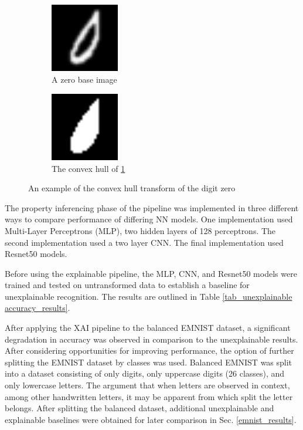 \documentclass[conference]{IEEEtran}
\begin{document}
\begin{figure}[h]
    \centering
    \begin{subfigure}{.5\columnwidth}
        \centering
        \includegraphics[width=3cm]{./images/raw_0-0-12.png}
        \caption{A zero base image}
        \label{fig:zero_raw}
    \end{subfigure}%
    \begin{subfigure}{.5\columnwidth}
        \centering
        \includegraphics[width=3cm]{./images/ch_0-0-12.png}
        \caption{The convex hull of \ref{fig:zero_raw}}
        \label{fig:zero_ch}
    \end{subfigure}
    \caption{An example of the convex hull transform of the digit zero}
    \label{fig:chull_example}
\end{figure}

The property inferencing phase of the pipeline was implemented in three
different ways to compare performance of differing NN models.  One
implementation used Multi-Layer Perceptrons (MLP), two hidden layers of 128
perceptrons.  The second implementation used a two layer CNN.  The final
implementation used Resnet50 models.

Before using the explainable pipeline, the MLP, CNN, and Resnet50 models were
trained and tested on untransformed data to establish a baseline for
unexplainable recognition.  The results are outlined in Table
\ref{tab_unexplainable accuracy_results}.

After applying the XAI pipeline to the balanced EMNIST dataset, a significant
degradation in accuracy was observed in comparison to the unexplainable results.
After considering opportunities for improving performance, the option of further
splitting the EMNIST dataset by classes was used.  Balanced EMNIST was
split into a dataset consisting of only digits, only uppercase digits (26
classes), and only lowercase letters.  The argument that when letters are
observed in context, among other handwritten letters, it may be apparent from
which split the letter belongs.  After splitting the balanced dataset,
additional unexplainable and explainable baselines were obtained for later
comparison in Sec. \ref{emnist_results}.
\end{document}
